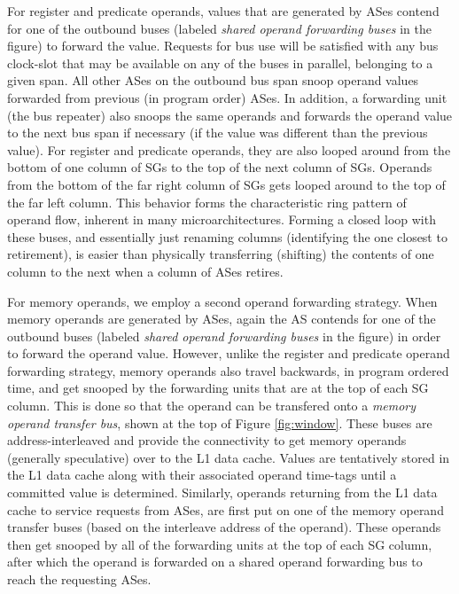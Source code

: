 \documentclass[10pt,twocolumn,dvips]{article}
\begin{document}
For register and predicate operands, values that are generated
by ASes contend for one of the outbound buses
(labeled \textit{shared operand forwarding buses} in the figure) 
to forward the value.
Requests for bus use will be satisfied with any bus clock-slot that may be
available on any of the buses in parallel, belonging to
a given span.  All other ASes on the outbound bus span snoop
operand values forwarded from previous (in program order)
ASes.  In addition, a forwarding unit (the bus repeater) also
snoops the same operands and forwards the operand value to the
next bus span if necessary (if the value was different than the previous
value).  For register and predicate operands, they are also
looped around from the bottom of one column of SGs
to the top of the next column of SGs.  
Operands from the bottom of the
far right column of SGs gets looped around to the
top of the far left column.  
This behavior forms the characteristic ring pattern of operand flow,
inherent in many microarchitectures.  Forming a closed loop
with these buses, and essentially just renaming columns (identifying the
one closest to retirement), is easier than physically transferring
(shifting) the contents of one column to the next when a column
of ASes retires.

For memory operands, we employ a second operand forwarding strategy.
When memory operands are generated by ASes, again the AS contends
for one of the outbound buses 
(labeled \textit{shared operand forwarding buses} in the figure) 
in order to forward the operand value.
However, unlike the register and predicate operand forwarding
strategy, memory operands also travel backwards, in program ordered
time, and get snooped by the forwarding units that are at the top
of each SG column.  This is done so that the operand can
be transfered onto a \textit{memory operand transfer bus}, shown
at the top of Figure \ref{fig:window}.  
These buses are address-interleaved and
provide the connectivity to get memory operands (generally
speculative) over to the L1 data cache.
Values are tentatively stored in the L1 data cache along with 
their associated operand
time-tags until a committed value is determined.
Similarly, operands returning from the L1 data cache to service requests
from ASes, are first put on one of the memory operand transfer buses (based
on the interleave address of the operand).  These operands then get snooped
by all of the forwarding units at the top of each SG
column, after which the operand is forwarded on a shared operand
forwarding bus to reach the requesting ASes.
\end{document}
